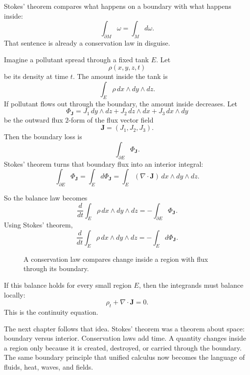 Stokes' theorem compares what happens on a boundary with what happens inside:
\[
    \int_{\partial M}\omega=\int_M d\omega.
\]
That sentence is already a conservation law in disguise.

Imagine a pollutant spread through a fixed tank \(E\).  Let
\[
    \rho(x,y,z,t)
\]
be its density at time \(t\).  The amount inside the tank is
\[
    \int_E \rho\,dx\wedge dy\wedge dz.
\]
If pollutant flows out through the boundary, the amount inside decreases.  Let
\[
    \Phi_{\mathbf J}
    =
    J_1\,dy\wedge dz+J_2\,dz\wedge dx+J_3\,dx\wedge dy
\]
be the outward flux \(2\)-form of the flux vector field
\[
    \mathbf J=(J_1,J_2,J_3).
\]
Then the boundary loss is
\[
    \int_{\partial E}\Phi_{\mathbf J}.
\]
Stokes' theorem turns that boundary flux into an interior integral:
\[
    \int_{\partial E}\Phi_{\mathbf J}
    =
    \int_E d\Phi_{\mathbf J}
    =
    \int_E (\nabla\cdot\mathbf J)\,dx\wedge dy\wedge dz.
\]

So the balance law becomes
\[
\boxed{
    \frac{d}{dt}
    \int_E \rho\,dx\wedge dy\wedge dz
    =
    -
    \int_{\partial E}\Phi_{\mathbf J}.
}
\]
Using Stokes' theorem,
\[
\boxed{
    \frac{d}{dt}
    \int_E \rho\,dx\wedge dy\wedge dz
    =
    -
    \int_E d\Phi_{\mathbf J}.
}
\]

\begin{figure}[h]
\centering
{}
\caption{A conservation law compares change inside a region with flux through its boundary.}
\end{figure}

If this balance holds for every small region \(E\), then the integrands must balance
locally:
\[
\boxed{
    \rho_t+\nabla\cdot\mathbf J=0.
}
\]
This is the continuity equation.

The next chapter follows that idea.  Stokes' theorem was a theorem about space:
boundary versus interior.  Conservation laws add time.  A quantity changes inside a
region only because it is created, destroyed, or carried through the boundary.  The
same boundary principle that unified calculus now becomes the language of fluids,
heat, waves, and fields.